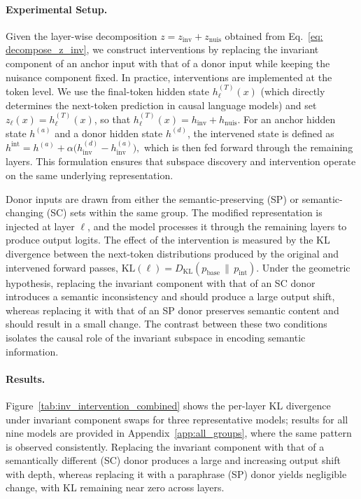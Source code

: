 \vspace{-0.8em}
\paragraph{Experimental Setup.}
Given the layer-wise decomposition $z = z_{\mathrm{inv}} + z_{\mathrm{nuis}}$ obtained from Eq.~\ref{eq: decompose_z_inv}, we construct interventions by replacing the invariant component of an anchor input with that of a donor input while keeping the nuisance component fixed. In practice, interventions are implemented at the token level. We use the final-token hidden state $h_\ell^{(T)}(x)$ (which directly determines the next-token prediction in causal language models) and set $z_\ell(x) = h_\ell^{(T)}(x)$, so that
\(
h_\ell^{(T)}(x) = h_{\mathrm{inv}} + h_{\mathrm{nuis}}.
\)
For an anchor hidden state $h^{(a)}$ and a donor hidden state $h^{(d)}$, the intervened state is defined as
\(
h^{\mathrm{int}} = h^{(a)} + \alpha \big(h_{\mathrm{inv}}^{(d)} - h_{\mathrm{inv}}^{(a)}\big),
\)
which is then fed forward through the remaining layers. This formulation ensures that subspace discovery and intervention operate on the same underlying representation.

Donor inputs are drawn from either the semantic-preserving (SP) or semantic-changing (SC) sets within the same group. The modified representation is injected at layer $\ell$, and the model processes it through the remaining layers to produce output logits. 
The effect of the intervention is measured by the KL divergence between the next-token distributions produced by the original and intervened forward passes, 
\(
\mathrm{KL}(\ell) = D_{\mathrm{KL}}\!\left(p_{\mathrm{base}} \,\|\, p_{\mathrm{int}}\right).
\) 
Under the geometric hypothesis, replacing the invariant component with that of an SC donor introduces a semantic inconsistency and should produce a large output shift, whereas replacing it with that of an SP donor preserves semantic content and should result in a small change. The contrast between these two conditions isolates the causal role of the invariant subspace in encoding semantic information.

\vspace{-0.8em}
\paragraph{Results.}
Figure~\ref{tab:inv_intervention_combined} shows the per-layer KL divergence under invariant component swaps for three representative models; results for all nine models are provided in Appendix~\ref{app:all_groups}, where the same pattern is observed consistently. Replacing the invariant component with that of a semantically different (SC) donor produces a large and increasing output shift with depth, whereas replacing it with a paraphrase (SP) donor yields negligible change, with KL remaining near zero across layers.

